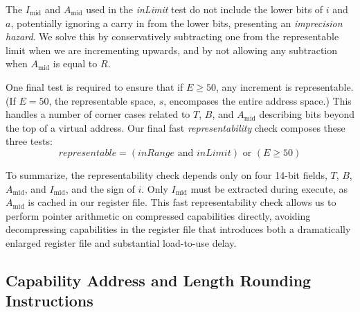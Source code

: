 The $I_\text{mid}$ and $A_\text{mid}$ used in the \emph{inLimit} test do not include the lower bits
of $i$ and $a$, potentially ignoring a carry in from the lower bits, presenting an \emph{imprecision hazard}.
We solve this by conservatively subtracting one from the representable limit
when we are incrementing upwards, and by not allowing any subtraction when $A_\text{mid}$ is equal to $R$.

One final test is required to ensure that if $E \geqslant 50$, any increment is representable.
(If $E = 50$, the representable space, $s$, encompases the entire address space.)
This handles a number of corner cases related to $T$, $B$, and $A_\text{mid}$ describing
bits beyond the top of a virtual address.
Our final fast \emph{representability} check composes these three tests:
\[ representable = (inRange  \text{~and~}  inLimit)  \text{~or~}  (E \geqslant 50)\]

To summarize, the representability check depends only on four 14-bit fields, $T$, $B$, $A_\text{mid}$,
and $I_\text{mid}$, and the sign of $i$.
Only $I_\text{mid}$ must be extracted during execute, as $A_\text{mid}$ is cached
in our register file.
This fast representability check allows us to perform pointer arithmetic on compressed capabilities directly, avoiding decompressing capabilities in the register file that introduces both a dramatically enlarged register file and substantial load-to-use delay.

\subsection{Capability Address and Length Rounding Instructions}
\label{sec:capability-address-and-length-rounding}

